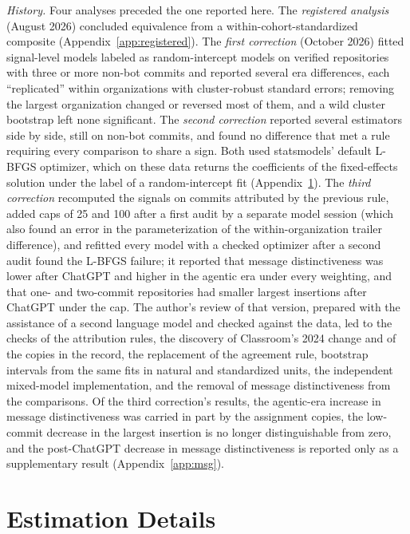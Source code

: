 \documentclass[acmsmall,screen,review,anonymous]{acmart}
\begin{document}
\textit{History.} Four analyses preceded the one reported here. The \textit{registered analysis} (August 2026) concluded equivalence from a within-cohort-standardized composite (Appendix~\ref{app:registered}). The \textit{first correction} (October 2026) fitted signal-level models labeled as random-intercept models on verified repositories with three or more non-bot commits and reported several era differences, each ``replicated'' within organizations with cluster-robust standard errors; removing the largest organization changed or reversed most of them, and a wild cluster bootstrap left none significant. The \textit{second correction} reported several estimators side by side, still on non-bot commits, and found no difference that met a rule requiring every comparison to share a sign. Both used statsmodels' default L-BFGS optimizer, which on these data returns the coefficients of the fixed-effects solution under the label of a random-intercept fit (Appendix~\ref{app:estimation}). The \textit{third correction} recomputed the signals on commits attributed by the previous rule, added caps of 25 and 100 after a first audit by a separate model session (which also found an error in the parameterization of the within-organization trailer difference), and refitted every model with a checked optimizer after a second audit found the L-BFGS failure; it reported that message distinctiveness was lower after ChatGPT and higher in the agentic era under every weighting, and that one- and two-commit repositories had smaller largest insertions after ChatGPT under the cap. The author's review of that version, prepared with the assistance of a second language model and checked against the data, led to the checks of the attribution rules, the discovery of Classroom's 2024 change and of the copies in the record, the replacement of the agreement rule, bootstrap intervals from the same fits in natural and standardized units, the independent mixed-model implementation, and the removal of message distinctiveness from the comparisons. Of the third correction's results, the agentic-era increase in message distinctiveness was carried in part by the assignment copies, the low-commit decrease in the largest insertion is no longer distinguishable from zero, and the post-ChatGPT decrease in message distinctiveness is reported only as a supplementary result (Appendix~\ref{app:msg}).

\FloatBarrier
\section{Estimation Details}
\label{app:estimation}
\end{document}
